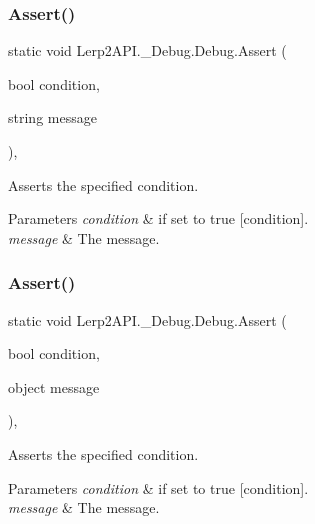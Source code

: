 \subsubsection{\texorpdfstring{Assert()}{Assert()}\hspace{0.1cm}{\footnotesize\ttfamily [2/5]}}
{\footnotesize\ttfamily static void Lerp2\+A\+P\+I.\+\_\+\+Debug.\+Debug.\+Assert (\begin{DoxyParamCaption}\item[{bool}]{condition,  }\item[{string}]{message }\end{DoxyParamCaption})\hspace{0.3cm}{\ttfamily [inline]}, {\ttfamily [static]}}



Asserts the specified condition. 


\begin{DoxyParams}{Parameters}
{\em condition} & if set to {\ttfamily true} \mbox{[}condition\mbox{]}.\\
\hline
{\em message} & The message.\\
\hline
\end{DoxyParams}
\mbox{\label{class_lerp2_a_p_i_1_1___debug_1_1_debug_ae67942ab4fefc4f50717b0853c9e147f}} 
\subsubsection{\texorpdfstring{Assert()}{Assert()}\hspace{0.1cm}{\footnotesize\ttfamily [3/5]}}
{\footnotesize\ttfamily static void Lerp2\+A\+P\+I.\+\_\+\+Debug.\+Debug.\+Assert (\begin{DoxyParamCaption}\item[{bool}]{condition,  }\item[{object}]{message }\end{DoxyParamCaption})\hspace{0.3cm}{\ttfamily [inline]}, {\ttfamily [static]}}



Asserts the specified condition. 


\begin{DoxyParams}{Parameters}
{\em condition} & if set to {\ttfamily true} \mbox{[}condition\mbox{]}.\\
\hline
{\em message} & The message.\\
\hline
\end{DoxyParams}
\mbox{\label{class_lerp2_a_p_i_1_1___debug_1_1_debug_a7fa3269678ad95e6c55ae3a9c193b39e}} 
